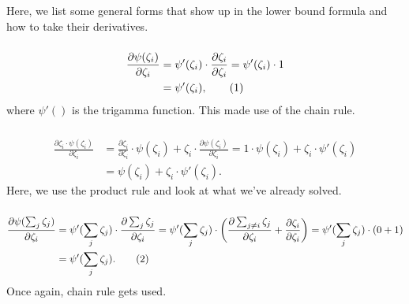 \documentclass[12pt]{article}
\newcommand\numberthis{\addtocounter{equation}{1}\tag{\theequation}}
\begin{document}
Here, we list some general forms that show up in the lower bound formula and how
to take their derivatives.

\subsubsection{}

\begin{align*}
    \frac{\partial \psi(\zeta_{i})}{\partial \zeta_{i}} &=
    \psi'(\zeta_{i})\cdot\frac{\partial \zeta_{i}}{\partial \zeta_{i}} =
    \psi'(\zeta_{i})\cdot 1
    \\& = \psi'(\zeta_{i}),\numberthis
\end{align*}
where $\psi'()$ is the trigamma function.  This made use of the chain rule.

\subsubsection{}

\begin{align*}
    \frac{\partial \zeta_{i}\cdot\psi(\zeta_{i})}{\partial \zeta_{i}}
    &=
    \frac{\partial \zeta_{i}}{\partial \zeta_{i}} \cdot \psi(\zeta_{i}) +
    \zeta_{i} \cdot \frac{\partial \psi(\zeta_{i})}{\partial \zeta_{i}}
    =
    1 \cdot \psi(\zeta_{i}) + \zeta_{i} \cdot \psi'(\zeta_{i})
    \\ &=
    \psi(\zeta_{i}) + \zeta_{i} \cdot \psi'(\zeta_{i}).
\end{align*}
Here, we use the product rule and look at what we've already solved.

\subsubsection{}

\begin{align*}
    \frac{\partial \psi(\sum_{j} \zeta_{j})}{\partial \zeta_{i}}
    &=
    \psi'(\sum_{j}\zeta_{j}) \cdot
    \frac{\partial \sum_{j} \zeta_{j}}{\partial \zeta_{i}}
    =
    \psi'(\sum_{j}\zeta_{j}) \cdot
    \left(\frac{\partial \sum_{j\neq i} \zeta_{j}}{\partial \zeta_{i}} +
    \frac{\partial \zeta_{i}}{\partial \zeta_{i}}\right)
    =
    \psi'(\sum_{j}\zeta_{j}) \cdot
    \left(0+1\right)
    \\ &=
    \psi'(\sum_{j}\zeta_{j}).
    \numberthis
\end{align*}
Once again, chain rule gets used.

\subsubsection{}
\end{document}
